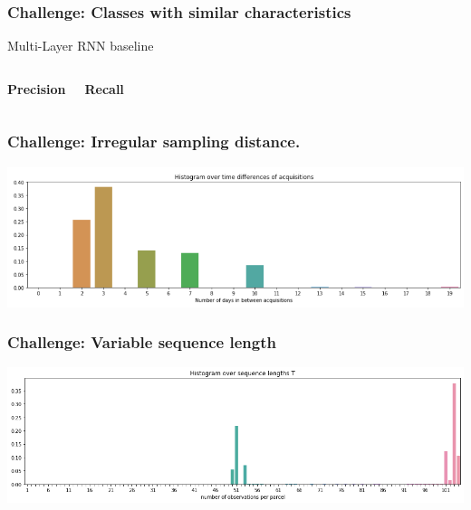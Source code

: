 \documentclass[%
  aspectratio=169,
  9pt,
  USenglish,
  titlegraphic, %
  affiliationintitlepagehead,
  affiliation,
]{beamer}
\begin{document}
\begin{frame}
\frametitle{Challenge: Classes with similar characteristics}

Multi-Layer RNN baseline

\begin{columns}

\textbf{Precision}


\textbf{Recall}


\end{columns}

\end{frame}

%
%
%
%
%
%
%
%


\begin{frame}
\frametitle{Challenge: Irregular sampling distance.}

\includegraphics[width=\textwidth]{images/days_between_acquisitions}

\end{frame}

\begin{frame}
\frametitle{Challenge: Variable sequence length}
\includegraphics[width=\textwidth]{images/sequencelengths}

\end{frame}
\end{document}
